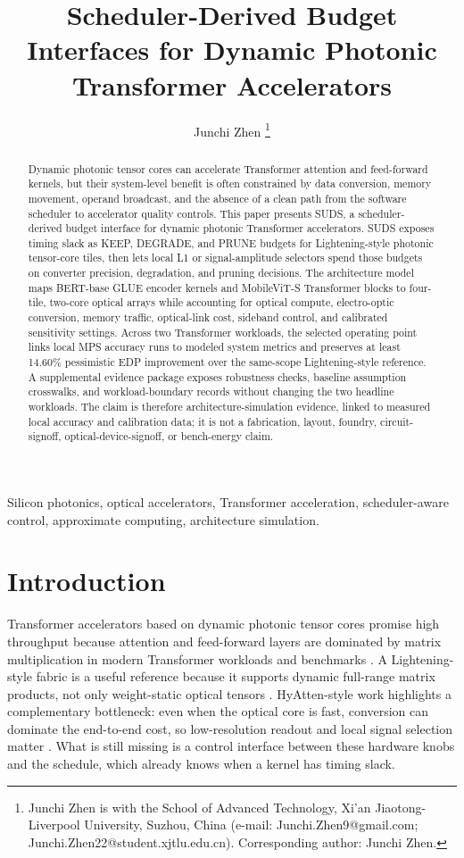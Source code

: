 \documentclass[10pt,journal]{IEEEtran}
\title{Scheduler-Derived Budget Interfaces for Dynamic Photonic Transformer Accelerators}
\author{Junchi Zhen%
\thanks{Junchi Zhen is with the School of Advanced Technology, Xi'an Jiaotong-Liverpool University, Suzhou, China (e-mail: Junchi.Zhen9@gmail.com; Junchi.Zhen22@student.xjtlu.edu.cn). Corresponding author: Junchi Zhen.}}
\begin{document}
\maketitle

\begin{abstract}
Dynamic photonic tensor cores can accelerate Transformer attention and
feed-forward kernels, but their system-level benefit is often constrained by
data conversion, memory movement, operand broadcast, and the absence of a clean
path from the software scheduler to accelerator quality controls. This paper
presents SUDS, a scheduler-derived budget interface for dynamic photonic
Transformer accelerators. SUDS exposes timing slack as KEEP, DEGRADE, and PRUNE
budgets for Lightening-style photonic tensor-core tiles, then lets local L1 or
signal-amplitude selectors spend those budgets on converter precision,
degradation, and pruning decisions. The architecture model maps BERT-base GLUE
encoder kernels and MobileViT-S Transformer blocks to four-tile, two-core
optical arrays while accounting for optical compute, electro-optic conversion,
memory traffic, optical-link cost, sideband control, and calibrated sensitivity
settings. Across two Transformer workloads, the selected operating point links
local MPS accuracy runs to modeled system metrics and preserves at least
14.60\% pessimistic EDP improvement over the same-scope Lightening-style
reference. A supplemental evidence package exposes robustness checks, baseline
assumption crosswalks, and workload-boundary records without changing the two
headline workloads. The claim is therefore architecture-simulation evidence,
linked to measured local accuracy and calibration data; it is not a fabrication,
layout, foundry, circuit-signoff, optical-device-signoff, or bench-energy claim.
\end{abstract}

\begin{IEEEkeywords}
Silicon photonics, optical accelerators, Transformer acceleration,
scheduler-aware control, approximate computing, architecture simulation.
\end{IEEEkeywords}

\section{Introduction}

Transformer accelerators based on dynamic photonic tensor cores promise high
throughput because attention and feed-forward layers are dominated by matrix
multiplication in modern Transformer workloads and benchmarks
\cite{vaswani2017attention,devlin2019bert,wang2019glue,mehta2022mobilevit,dosovitskiy2021vit}.
A Lightening-style fabric is a useful reference because it
supports dynamic full-range matrix products, not only weight-static optical
tensors \cite{lightening2024}. HyAtten-style work highlights a complementary
bottleneck: even when
the optical core is fast, conversion can dominate the end-to-end cost, so
low-resolution readout and local signal selection matter \cite{hyatten2025}.
What is still missing is a control interface between these hardware knobs and
the schedule, which already knows when a kernel has timing slack.
\end{document}

